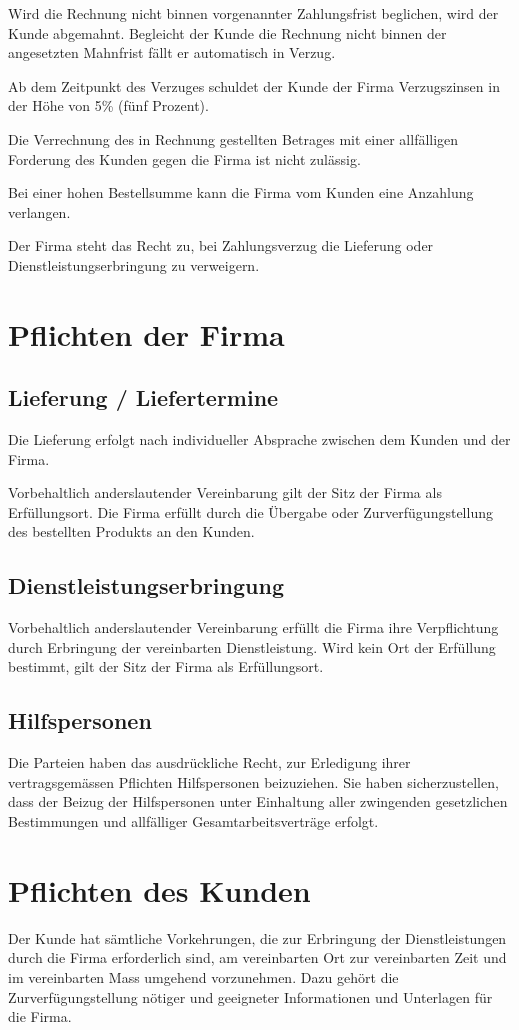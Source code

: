 \documentclass[twocolumn, 10pt]{article}
\begin{document}
Wird die Rechnung nicht binnen vorgenannter Zahlungsfrist beglichen, wird der Kunde abgemahnt. Begleicht der Kunde die Rechnung nicht binnen der angesetzten Mahnfrist fällt er automatisch in Verzug.

Ab dem Zeitpunkt des Verzuges schuldet der Kunde der Firma Verzugszinsen in der Höhe von 5\% (fünf Prozent).

Die Verrechnung des in Rechnung gestellten Betrages mit einer allfälligen Forderung des Kunden gegen die Firma ist nicht zulässig.

Bei einer hohen Bestellsumme kann die Firma vom Kunden eine Anzahlung verlangen.

Der Firma steht das Recht zu, bei Zahlungsverzug die Lieferung oder Dienstleistungserbringung zu verweigern.

\section{Pflichten der Firma}
\subsection{Lieferung / Liefertermine}
Die Lieferung erfolgt nach individueller Absprache zwischen dem Kunden und der Firma.

Vorbehaltlich anderslautender Vereinbarung gilt der Sitz der Firma als Erfüllungsort. Die Firma erfüllt durch die Übergabe oder Zurverfügungstellung des bestellten Produkts an den Kunden.

\subsection{Dienstleistungserbringung}
Vorbehaltlich anderslautender Vereinbarung erfüllt die Firma ihre Verpflichtung durch Erbringung der vereinbarten Dienstleistung. Wird kein Ort der Erfüllung bestimmt, gilt der Sitz der Firma als Erfüllungsort.

\subsection{Hilfspersonen}
Die Parteien haben das ausdrückliche Recht, zur Erledigung ihrer vertragsgemässen Pflichten Hilfspersonen beizuziehen. Sie haben sicherzustellen, dass der Beizug der Hilfspersonen unter Einhaltung aller zwingenden gesetzlichen Bestimmungen und allfälliger Gesamtarbeitsverträge erfolgt.

\section{Pflichten des Kunden}
Der Kunde hat sämtliche Vorkehrungen, die zur Erbringung der Dienstleistungen durch die Firma erforderlich sind, am vereinbarten Ort zur vereinbarten Zeit und im vereinbarten Mass umgehend vorzunehmen. Dazu gehört die Zurverfügungstellung nötiger und geeigneter Informationen und Unterlagen für die Firma.
\end{document}

